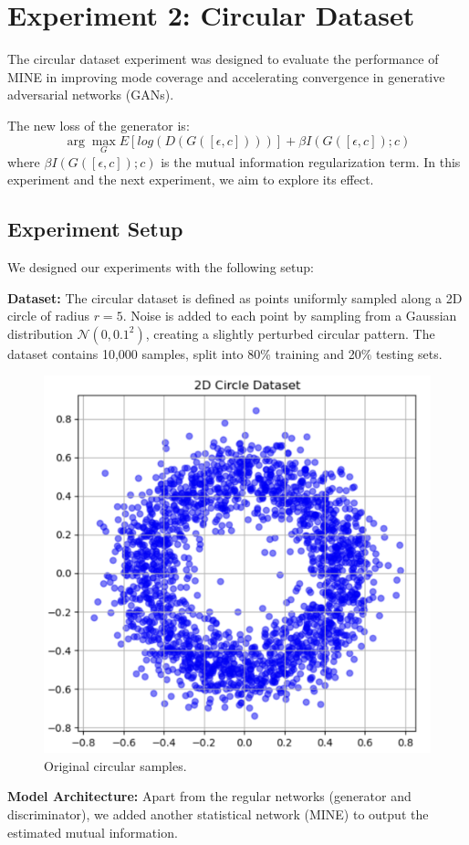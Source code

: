 \documentclass[lettersize,journal]{IEEEtran}
\begin{document}
\section{Experiment 2: Circular Dataset}
The circular dataset experiment was designed to evaluate the performance of MINE in improving mode coverage and accelerating convergence in generative adversarial networks (GANs). 

The new loss of the generator is:
$$\arg \max_G E[log(D(G([\epsilon, c])))] + \beta I(G([\epsilon, c]); c)$$
where $\beta I(G([\epsilon, c]); c)$ is the mutual information regularization term. In this experiment and the next experiment, we aim to explore its effect.

\subsection{Experiment Setup}
We designed our experiments with the following setup:

\textbf{Dataset:} The circular dataset is defined as points uniformly sampled along a 2D circle of radius \( r = 5 \). Noise is added to each point by sampling from a Gaussian distribution \( \mathcal{N}(0, 0.1^2) \), creating a slightly perturbed circular pattern. The dataset contains 10,000 samples, split into 80\% training and 20\% testing sets.
\begin{figure}[h]
    \centering
    \includegraphics[width=0.55\linewidth]{figures/circular_samples.png}
    \caption{Original circular samples.}
    \label{fig:original_samples}
\end{figure}
    
    \textbf{Model Architecture:}
    Apart from the regular networks (generator and discriminator), we added another statistical network (MINE) to output the estimated mutual information.
    
\end{document}
